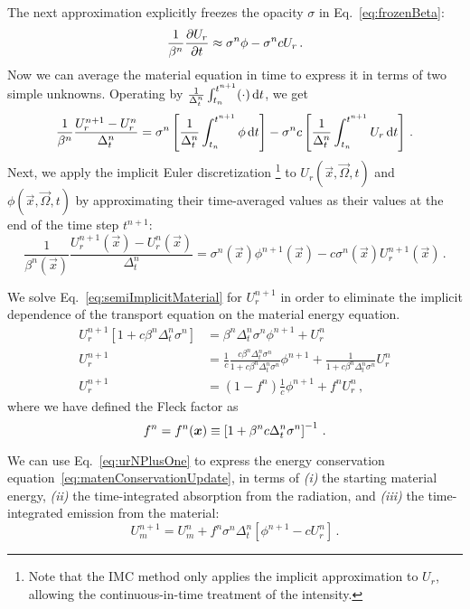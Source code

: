 The next approximation explicitly freezes the opacity $\sigma$ in
Eq.~\eqref{eq:frozenBeta}:
\begin{equation*}
  \frac{1}{\beta^n}
  \frac{\partial U_r}{\partial t} \approx \sigma^n \phi - \sigma^n c U_r \,.
\end{equation*}
Now we can average the material equation in time to express it in terms of two
simple unknowns. Operating by
$\frac{1}{\Delta_t^n}\int_{t_n}^{t^{n+1}} (\cdot) \mathop{}\!\mathrm{d} t$,
we get
\begin{equation*}
  \frac{1}{\beta^n}
  \frac{U_r^{n+1} - U_r^n}{\Delta_t^n} = \sigma^n \left[
  \frac{1}{\Delta_t^n}\int_{t_n}^{t^{n+1}} \phi \mathop{}\!\mathrm{d} t
  \right] - \sigma^n c \left[
  \frac{1}{\Delta_t^n}\int_{t_n}^{t^{n+1}} U_r \mathop{}\!\mathrm{d} t \right]\,.
\end{equation*}
Next, we apply the implicit Euler discretization%
\footnote{Note that the IMC method only applies the implicit approximation to
$U_r$, allowing the continuous-in-time treatment of the intensity.}
to $U_r(\vec{x}, \vec{\Omega}, t)$ and $\phi(\vec{x}, \vec{\Omega}, t)$ by
approximating their time-averaged values as their values at the end of the time
step $t^{n+1}$:
\begin{equation} \label{eq:semiImplicitMaterial}
  \frac{1}{\beta^n(\vec{x})}
  \frac{U_r^{n+1}(\vec{x}) - U_r^n(\vec{x})}{\Delta_t^n}
  = \sigma^n(\vec{x}) \phi^{n+1}(\vec{x})
  - c \sigma^n(\vec{x}) U_r^{n+1}(\vec{x}) \,.
\end{equation}

We solve Eq.~\eqref{eq:semiImplicitMaterial} for $U_r^{n+1}$ in order to
eliminate the implicit dependence of the transport equation on the material
energy equation.
\begin{align} \nonumber
  U_r^{n+1} [ 1 + c \beta^n \Delta_t^n \sigma^n ]
  &= \beta^n \Delta_t^n \sigma^n\phi^{n+1} + U_r^n
   \\ \nonumber
  U_r^{n+1}
  &= \frac1c \frac{ c \beta^n \Delta_t^n \sigma^n }{ 1 + c \beta^n \Delta_t^n \sigma^n}
  \phi^{n+1} + \frac1{ 1 + c \beta^n \Delta_t^n \sigma^n}
  U_r^n
  \\ \label{eq:urNPlusOne}
  U_r^{n+1}
  &= \left(1 - f^n\right) \frac1c \phi^{n+1} + f^n U_r^n \,,
\end{align}
where we have defined the Fleck factor \cite{Fle1971} as
\begin{equation} \label{eq:fleckFactor}
  f^n = f^n(\bm{x}) \equiv \left[ 1 + \beta^n c \Delta_t^n \sigma^n
  \right]^{-1} \,.
\end{equation}

We can use Eq.~\eqref{eq:urNPlusOne} to express the energy conservation
equation~\eqref{eq:matenConservationUpdate}, in terms of \textsl{(i)} the starting
material energy, \textsl{(ii)} the time-integrated absorption from the radiation, and
\textsl{(iii)} the time-integrated emission from the material:
\begin{equation}\label{eq:matenConservationUpdate2}
  U_m^{n+1} = U_m^n + f^n \sigma^n \Delta_t^n
  \left[ \phi^{n+1} - c U_r^n \right] \,.
\end{equation}


